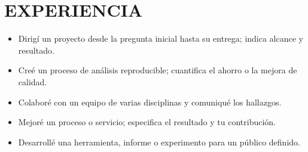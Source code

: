 \section{EXPERIENCIA}
\begin{itemize}
\item Dirigí un proyecto desde la pregunta inicial hasta su entrega; indica alcance y resultado.
\item Creé un proceso de análisis reproducible; cuantifica el ahorro o la mejora de calidad.
\item Colaboré con un equipo de varias disciplinas y comuniqué los hallazgos.
\end{itemize}
\vspace{3pt}
\begin{itemize}
\item Mejoré un proceso o servicio; especifica el resultado y tu contribución.
\item Desarrollé una herramienta, informe o experimento para un público definido.
\end{itemize}
